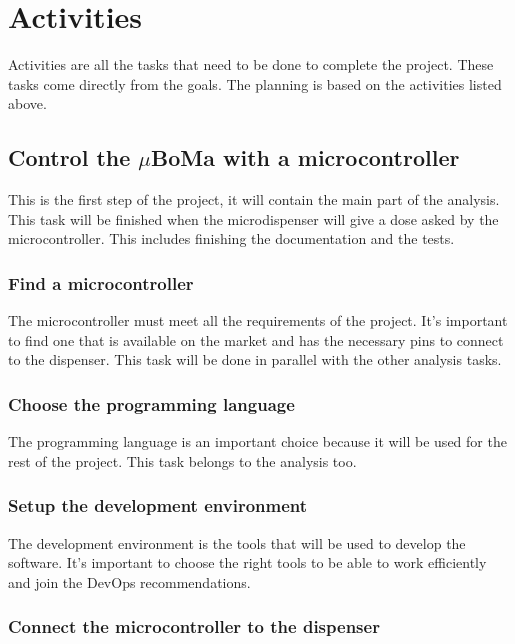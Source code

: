 \chapter{Activities}
\label{chap:activities}

Activities are all the tasks that need to be done to complete the project.
These tasks come directly from the goals.
The planning is based on the activities listed above.

\section{Control the $\mu$BoMa with a microcontroller}
\label{sec:activities:control}

This is the first step of the project, it will contain the main part of the analysis.
This task will be finished when the microdispenser will give a dose asked by the microcontroller.
This includes finishing the documentation and the tests.


\subsection{Find a microcontroller}
\label{sec:activities:control:find}

The microcontroller must meet all the requirements of the project.
It's important to find one that is available on the market and has the necessary pins to connect to the dispenser.
This task will be done in parallel with the other analysis tasks.


\subsection{Choose the programming language}
\label{sec:activities:control:language}

The programming language is an important choice because it will be used for the rest of the project.
This task belongs to the analysis too.

\subsection{Setup the development environment}
\label{sec:activities:control:environment}

The development environment is the tools that will be used to develop the software.
It's important to choose the right tools to be able to work efficiently and join the DevOps recommendations.

\subsection{Connect the microcontroller to the dispenser}
\label{sec:activities:control:connect}

